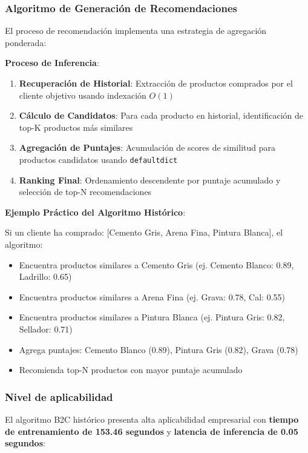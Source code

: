 \documentclass[twocolumn]{article}
\begin{document}
\subsubsection{Algoritmo de Generación de Recomendaciones}

El proceso de recomendación implementa una estrategia de agregación ponderada:

\textbf{Proceso de Inferencia}:
\begin{enumerate}
    \item \textbf{Recuperación de Historial}: Extracción de productos comprados por el cliente objetivo usando indexación \(O(1)\)
    \item \textbf{Cálculo de Candidatos}: Para cada producto en historial, identificación de top-K productos más similares
    \item \textbf{Agregación de Puntajes}: Acumulación de scores de similitud para productos candidatos usando \texttt{defaultdict}
    \item \textbf{Ranking Final}: Ordenamiento descendente por puntaje acumulado y selección de top-N recomendaciones
\end{enumerate}

\textbf{Ejemplo Práctico del Algoritmo Histórico}:

Si un cliente ha comprado: [Cemento Gris, Arena Fina, Pintura Blanca], el algoritmo:
\begin{itemize}
    \item Encuentra productos similares a Cemento Gris (ej. Cemento Blanco: 0.89, Ladrillo: 0.65)
    \item Encuentra productos similares a Arena Fina (ej. Grava: 0.78, Cal: 0.55)
    \item Encuentra productos similares a Pintura Blanca (ej. Pintura Gris: 0.82, Sellador: 0.71)
    \item Agrega puntajes: Cemento Blanco (0.89), Pintura Gris (0.82), Grava (0.78)
    \item Recomienda top-N productos con mayor puntaje acumulado
\end{itemize}

\subsubsection{Nivel de aplicabilidad}

El algoritmo B2C histórico presenta alta aplicabilidad empresarial con \textbf{tiempo de entrenamiento de 153.46 segundos} y \textbf{latencia de inferencia de 0.05 segundos}:
\end{document}
